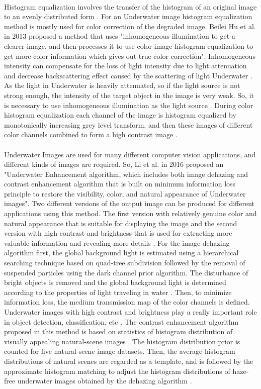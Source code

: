 \documentclass[a4paper,11pt,oneside]{article}
\begin{document}
  \\
  Histogram equalization involves the transfer of the histogram of an original image to an evenly distributed form \cite{1}. For an Underwater image histogram equalization method is mostly used for color correction of the degraded image. Beilei Hu et al. \cite{1} in 2013 proposed a method that uses "inhomogeneous illumination to get a clearer image, and then processes it to use color image histogram equalization to get more color information which gives out true color correction". Inhomogeneous intensity can compensate for the loss of light intensity due to light attenuation and decrease backscattering effect caused by the scattering of light Underwater \cite{1}. As the light in Underwater is heavily attenuated, so if the light source is not strong enough, the intensity of the target object in the image is very weak. So, it is necessary to use inhomogeneous illumination as the light source \cite{1}. During color histogram equalization each channel of the image is histogram equalized by monotonically increasing grey level transform, and then these images of different color channels combined to form a high contrast image \cite{1}.\\
  \\
   Underwater Images are used for many different computer vision applications, and different kinds of images are required. So, Li et al. in 2016 \cite{21} proposed an "Underwater Enhancement algorithm, which includes both image dehazing and contrast enhancement algorithm that is built on minimum information loss principle to restore the visibility, color, and natural appearance of Underwater images". Two different versions of the output image can be produced for different applications using this method. The first version with relatively genuine color and natural appearance that is suitable for displaying the image and the second version with high contrast and brightness that is used for extracting more valuable information and revealing more details \cite{21}. For the image dehazing algorithm first, the global background light is estimated using a hierarchical searching technique based on quad-tree subdivision followed by the removal of suspended particles using the dark channel prior algorithm. The disturbance of bright objects is removed and the global background light is determined according to the properties of light traveling in water \cite{21}. Then, to minimize information loss, the medium transmission map of the color channels is defined. Underwater images with high contrast and brightness play a really important role in object detection, classification, etc \cite{21}. The contrast enhancement algorithm proposed in this method is based on statistics of histogram distribution of visually appealing natural-scene images \cite{21}. The histogram distribution prior is counted for five natural-scene image datasets. Then, the average histogram distributions of natural scenes are regarded as a template, and is followed by the approximate histogram matching to adjust the histogram distributions of haze-free underwater images obtained by the dehazing algorithm \cite{21}.\\
\end{document}

